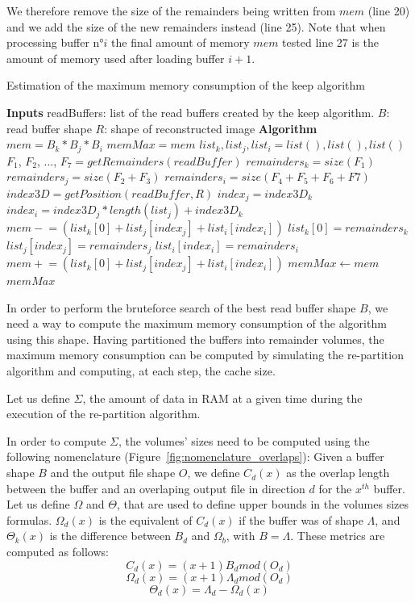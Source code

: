 \documentclass[sigconf, nonacm]{acmart}
\begin{document}
We therefore remove the size of the remainders being written from $mem$ (line 20)
and we add the size of the new remainders instead (line 25).
Note that when processing buffer n°$i$ the final amount of memory $mem$ tested
line 27 is the amount of memory used after loading buffer $i+1$.
\begin{algorithm}
  \caption{Estimation of the maximum memory consumption of the keep algorithm}
  \label{algo:max_mem_keep_algorithm}
  \begin{algorithmic}[1]
    \STATE \textbf{Inputs}
    \STATE readBuffers: list of the read buffers created by the keep algorithm.
    \STATE $B$: read buffer shape
    \STATE $R$: shape of reconstructed image
    \STATE
    \STATE \textbf{Algorithm}
    \STATE $mem = B_k*B_j*B_i$
    \STATE $memMax = mem$
    \STATE $list_k, list_j, list_i = list(), list(), list()$
    \STATE
      \STATE $F_1$, $F_2$, ..., $F_7= getRemainders(readBuffer)$
      \STATE $remainders_k = size(F_1)$
      \STATE $remainders_j = size(F_2+F_3)$
      \STATE $remainders_i = size(F_4+F_5+F_6+F7)$
      \STATE $index3D = getPosition(readBuffer,R)$
      \STATE
      \STATE $index_j = index3D_k$
      \STATE $index_i = index3D_j*length(list_j) + index3D_k$
      \STATE $mem \mathrel{-}= (list_k[0] + list_j[index_j] + list_i[index_i])$
      \STATE
      \STATE $list_k[0] = remainders_k$
      \STATE $list_j[index_j] = remainders_j$
      \STATE $list_i[index_i] = remainders_i$
      \STATE $mem \mathrel{+}= (list_k[0] + list_j[index_j] + list_i[index_i])$
      \STATE
        \STATE $memMax\leftarrow mem$
      \ENDIF
    \ENDFOR
    \RETURN $memMax$
  \end{algorithmic}
\end{algorithm}

In order to perform the bruteforce search of the best read buffer shape $B$,
we need a way to compute the maximum memory consumption of the algorithm using
this shape.
Having partitioned the buffers into remainder volumes, the maximum memory
consumption can be computed by simulating the re-partition algorithm and
computing, at each step, the cache size.

Let us define $\Sigma$, the amount of data in RAM at a given time during the
execution of the re-partition algorithm.

In order to compute $\Sigma$, the volumes' sizes need to be computed using the
following nomenclature (Figure~\ref{fig:nomenclature_overlaps}):
Given a buffer shape $B$ and the output file shape $O$, we define $C_d(x)$ as
the overlap length between the buffer and an overlaping output file in direction
$d$ for the $x^{th}$ buffer. Let us define $\Omega$ and $\Theta$, that are used
to define upper bounds in the volumes sizes formulas. $\Omega_d(x)$ is the
equivalent of $C_d(x)$ if the buffer was of shape $\Lambda$, and $\Theta_k(x)$
is the difference between $B_d$ and $\Omega_b$, with $B=\Lambda$.
These metrics are computed as follows:
$$C_d(x) = (x+1)B_d mod(O_d)$$
$$\Omega_d(x) = (x+1)\Lambda_d mod(O_d)$$
$$\Theta_d(x) = \Lambda_d - \Omega_d(x)$$
\end{document}
